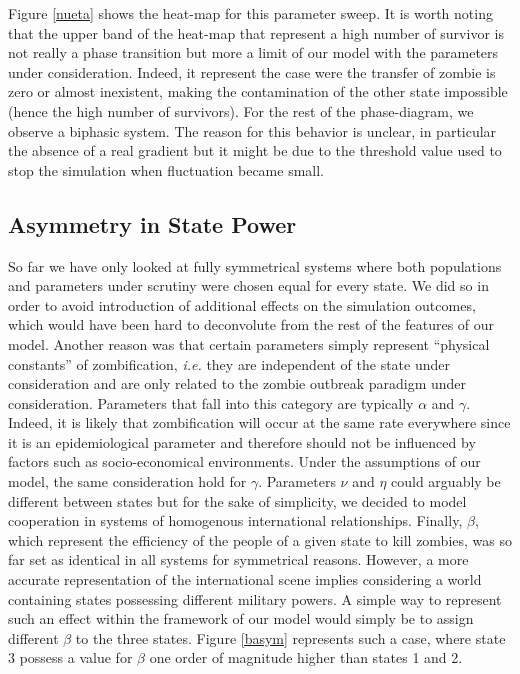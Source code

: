 \documentclass[11pt]{article} %
\begin{document}
Figure \ref{nueta} shows the heat-map for this parameter sweep. It is worth noting that the upper band of the heat-map that represent a high number of survivor is not really a phase transition but more a limit of our model with the parameters under consideration. Indeed, it represent the case were the transfer of zombie is zero or almost inexistent, making the contamination of the other state impossible (hence the high number of survivors). For the rest of the phase-diagram, we observe a biphasic system. The reason for this behavior is unclear, in particular the absence of a real gradient but it might be due to the threshold value used to stop the simulation when fluctuation became small. 



\subsection{Asymmetry in State Power}\indent

So far we have only looked at fully symmetrical systems where both populations and parameters under scrutiny were chosen equal for every state. We did so in order to avoid introduction of additional effects on the simulation outcomes, which would have been hard to deconvolute from the rest of the features of our model. Another reason was that certain parameters simply represent ``physical constants'' of zombification, \textit{i.e.} they are independent of the state under consideration and are only related to the zombie outbreak paradigm under consideration. Parameters that fall into this category are typically $\alpha$ and $\gamma$. Indeed, it is likely that zombification will occur at the same rate everywhere since it is an epidemiological parameter and therefore should not be influenced by factors such as socio-economical environments. Under the assumptions of our model, the same consideration hold for $\gamma$. Parameters $\nu$ and $\eta$ could arguably be different between states but for the sake of simplicity, we decided to model cooperation in systems of homogenous international relationships. Finally, $\beta$, which represent the efficiency of the people of a given state to kill zombies, was so far set as identical in all systems for symmetrical reasons. However, a more accurate representation of the international scene implies considering a world containing states possessing different military powers. A simple way to represent such an effect within the framework of our model would simply be to assign different $\beta$ to the three states. Figure \ref{basym} represents such a case, where state 3 possess a value for $\beta$ one order of magnitude higher than states 1 and 2. 
 
\end{document}
